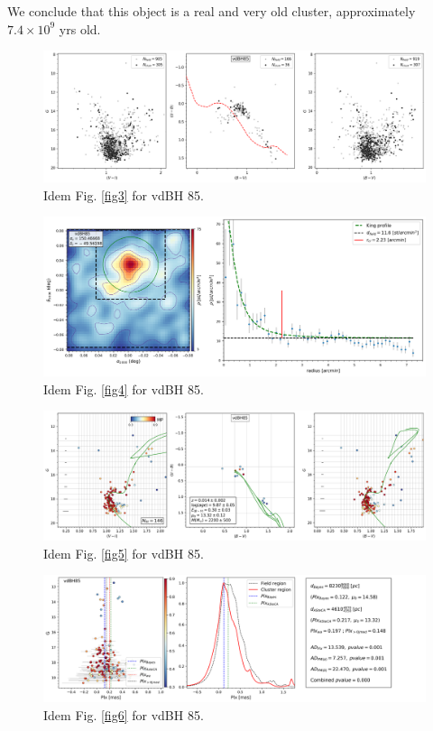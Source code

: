 \documentclass[draft]{aa}
\begin{document}
We conclude that this object is a real and very old cluster, approximately
$7.4\times10^9$ yrs old.

\begin{figure}[ht]
    \centering
    \includegraphics[width=\hsize]{../figs/obs_vdBH85.png}
    \caption{Idem Fig. \ref{fig3} for vdBH 85.}
    \label{fig11}
\end{figure}

\begin{figure}[ht]
    \centering
    \includegraphics[width=\hsize]{../figs/dmap_vdbh85.png}
    \caption{Idem Fig. \ref{fig4} for vdBH 85.}
    \label{fig12}
\end{figure}

\begin{figure}[ht]
    \centering
    \includegraphics[width=\hsize]{../figs/cmds_vdbh85.png}
    \caption{Idem Fig. \ref{fig5} for vdBH 85.}
    \label{fig13}
\end{figure}

\begin{figure}[ht]
    \centering
    \includegraphics[width=\hsize]{../figs/plx_vdBH85.png}
    \caption{Idem Fig. \ref{fig6} for vdBH 85.}
    \label{fig14}
\end{figure}
\end{document}
